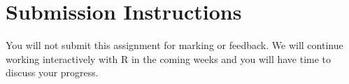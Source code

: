 \documentclass[a4paper,12pt]{article}
\begin{document}
\section{Submission Instructions}

You will not submit this assignment for marking or feedback. We will continue working interactively with R in the coming weeks and you will have time to discuss your progress.
\end{document}
